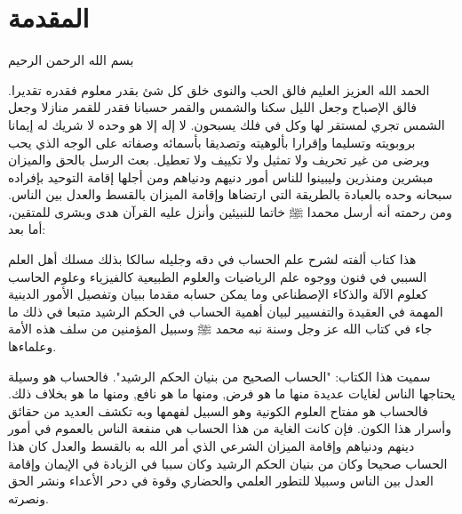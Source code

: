 \chapter*{المقدمة}

\begin{center}
    بسم الله الرحمن الرحيم
\end{center}

الحمد الله العزيز العليم فالق الحب والنوى خلق كل شئ بقدر معلوم فقدره تقديرا. فالق الإصباح وجعل الليل سكنا والشمس والقمر حسبانا فقدر للقمر منازلا وجعل الشمس تجري لمستقر لها وكل في فلك يسبحون. لا إله إلا هو وحده لا شريك له  إيمانا بروبويته وتسليما وإقرارا بألوهيته وتصديقا بأسمائه وصفاته على الوجه الذي يحب ويرضى من غير تحريف ولا تمثيل ولا تكييف ولا تعطيل. بعث الرسل بالحق والميزان مبشرين ومنذرين وليبينوا للناس أمور دنيهم ودنياهم ومن أجلها إقامة التوحيد بإفراده سبحانه وحده بالعبادة بالطريقة التي ارتضاها وإقامة الميزان بالقسط والعدل بين الناس. ومن رحمته أنه أرسل محمدا ﷺ خاتما للنبيئين وأنزل عليه القرآن هدى وبشرى للمتقين، أما بعد:

هذا كتاب ألفته لشرح علم الحساب في دقه وجليله سالكا بذلك مسلك أهل العلم السببي في فنون ووجوه علم الرياضيات والعلوم الطبيعية كالفيزياء وعلوم الحاسب كعلوم الآلة والذكاء الإصطناعي وما يمكن حسابه مقدما ببيان وتفصيل الأمور الدينية المهمة في العقيدة والتفسيير لبيان أهمية الحساب في الحكم الرشيد متبعا في ذلك ما جاء في كتاب الله عز وجل وسنة نبه محمد ﷺ وسبيل المؤمنين من سلف هذه الأمة وعلماءها.

سميت هذا الكتاب: "الحساب الصحيح من بنيان الحكم الرشيد". فالحساب هو وسيلة يحتاجها الناس لغايات عديدة منها ما هو فرض, ومنها ما هو نافع, ومنها ما هو بخلاف ذلك. فالحساب هو مفتاح العلوم الكونية وهو السبيل لفهمها وبه تكشف العديد من حقائق وأسرار هذا الكون. فإن كانت الغاية من هذا الحساب هي منفعة الناس بالعموم في أمور دينهم ودنياهم وإقامة الميزان الشرعي الذي أمر الله به بالقسط والعدل كان هذا الحساب صحيحا وكان من بنيان الحكم الرشيد وكان سببا في الزيادة في الإيمان وإقامة العدل بين الناس وسبيلا للتطور العلمي والحضاري وقوة في دحر الأعداء ونشر الحق ونصرته.

